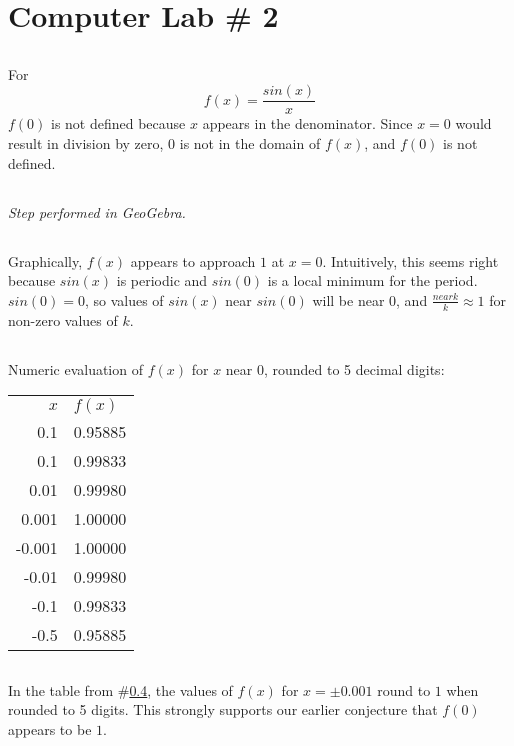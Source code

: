 \documentclass{article}
\begin{document}
\section*{Computer Lab \# 2}

\subsection{}
For $$f(x) = \frac{sin(x)}{x}$$ $f(0)$ is not defined because $x$ appears in the
denominator. Since $x = 0$ would result in division by zero, $0$ is not in the
domain of $f(x)$, and $f(0)$ is not defined.

\subsection{}
\emph{Step performed in GeoGebra.}

\subsection{}
Graphically, $f(x)$ appears to approach $1$ at $x=0$. Intuitively, this seems right
because $sin(x)$ is periodic and $sin(0)$ is a local minimum for the period.
$sin(0)=0$, so values of $sin(x)$ near $sin(0)$ will be near 0, and
$\frac{near k}{k} \approx 1$ for non-zero values of $k$.

\subsection{} \label{numeric}
Numeric evaluation of $f(x)$ for $x$ near $0$, rounded to 5 decimal digits:
\\

\begin{tabular}{rl}
    $x$       & $f(x)$ \\
    0.1     & 0.95885  \\
    0.1     & 0.99833   \\
    0.01    & 0.99980   \\
    0.001   & 1.00000   \\
    -0.001  & 1.00000  \\
    -0.01   & 0.99980  \\
    -0.1    & 0.99833  \\
    -0.5    & 0.95885  \\
\end{tabular}

\subsection{}
In the table from \#\ref{numeric}, the values of $f(x)$ for $x = \pm 0.001$ round
to $1$ when rounded to 5 digits. This strongly supports our earlier conjecture that
$f(0)$ appears to be $1$.
\end{document}
